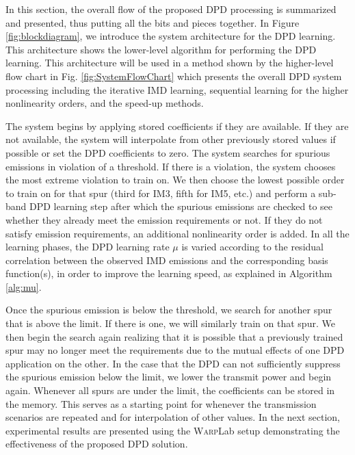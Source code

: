 In this section, the overall flow of the proposed DPD processing is summarized and presented, thus putting all the bits and pieces together. 
{\color{red}In Figure \ref{fig:blockdiagram}, we introduce the system architecture for the DPD learning. This architecture shows the lower-level algorithm for performing the DPD learning. This architecture will be used in a method shown by the higher-level flow chart in Fig. \ref{fig:SystemFlowChart} which presents the overall DPD system processing including the iterative IMD learning, sequential learning for the higher nonlinearity orders, and the speed-up methods.}

The system begins by applying stored coefficients if they are available. 
If they are not available, the system will interpolate from other previously stored values if possible or set the DPD coefficients to zero. 
The system searches for spurious emissions in violation of a threshold. 
If there is a violation, the system chooses the most extreme violation to train on. 
We then choose the lowest possible order to train on for that spur (third for IM3, fifth for IM5, etc.) and perform a sub-band DPD learning step after which the spurious emissions are checked to see whether they already meet the emission requirements or not. 
If they do not satisfy emission requirements, an additional nonlinearity order is added. 
In all the learning phases, the DPD learning rate $\mu$ is varied according to the residual correlation between the observed IMD emissions and the corresponding basis function(s), in order to improve the learning speed, as explained in Algorithm \ref{alg:mu}. 

Once the spurious emission is below the threshold, we search for another spur that is above the limit. If there is one, we will similarly train on that spur. We then begin the search again realizing that it is possible that a previously trained spur may no longer meet the requirements due to the mutual effects of one DPD application on the other. In the case that the DPD can not sufficiently suppress the spurious emission below the limit, we lower the transmit power and begin again. Whenever all spurs are under the limit, the coefficients can be stored in the memory.
This serves as a starting point for whenever the transmission scenarios are repeated and for interpolation of other values. 
In the next section, experimental results are presented using the \textsc{Warp}Lab setup demonstrating the effectiveness of the proposed DPD solution.

